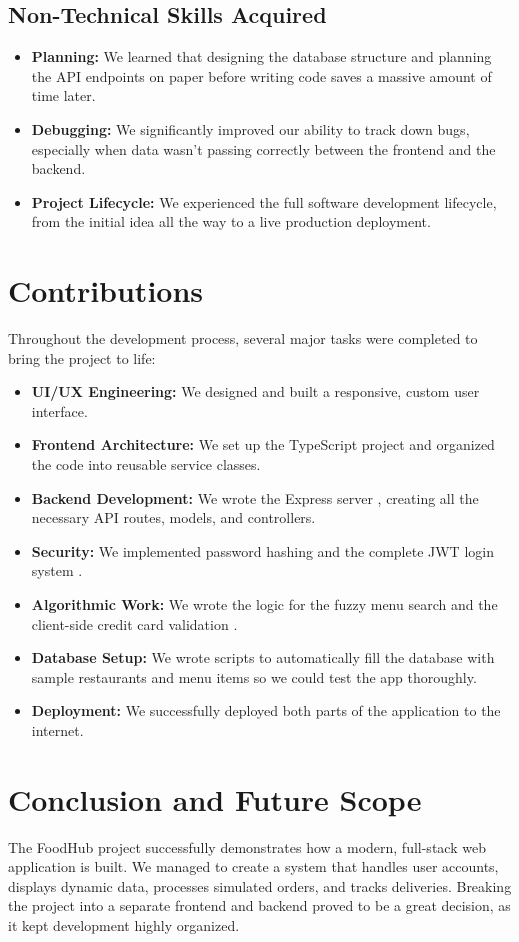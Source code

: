 \documentclass[conference]{IEEEtran}
\begin{document}
\subsection{Non-Technical Skills Acquired}
\begin{itemize}
\item \textbf{Planning:} We learned that designing the database structure and planning the API endpoints on paper before writing code saves a massive amount of time later.
\item \textbf{Debugging:} We significantly improved our ability to track down bugs, especially when data wasn't passing correctly between the frontend and the backend.
\item \textbf{Project Lifecycle:} We experienced the full software development lifecycle, from the initial idea all the way to a live production deployment.
\end{itemize}

\section{Contributions}
Throughout the development process, several major tasks were completed to bring the project to life:

\begin{itemize}
\item \textbf{UI/UX Engineering:} We designed and built a responsive, custom user interface.
\item \textbf{Frontend Architecture:} We set up the TypeScript project \cite{b2} and organized the code into reusable service classes.
\item \textbf{Backend Development:} We wrote the Express server \cite{b4}, creating all the necessary API routes, models, and controllers.
\item \textbf{Security:} We implemented password hashing and the complete JWT login system \cite{b7}.
\item \textbf{Algorithmic Work:} We wrote the logic for the fuzzy menu search and the client-side credit card validation \cite{b6}.
\item \textbf{Database Setup:} We wrote scripts to automatically fill the database with sample restaurants and menu items so we could test the app thoroughly.
\item \textbf{Deployment:} We successfully deployed both parts of the application to the internet.
\end{itemize}

\section{Conclusion and Future Scope}
The FoodHub project successfully demonstrates how a modern, full-stack web application is built. We managed to create a system that handles user accounts, displays dynamic data, processes simulated orders, and tracks deliveries. Breaking the project into a separate frontend and backend proved to be a great decision, as it kept development highly organized.
\end{document}
